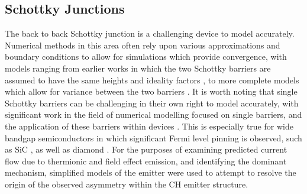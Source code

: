 \begin{refsection}
\subsection{Schottky Junctions}
The back to back Schottky junction is a challenging device to model accurately. Numerical methods in this area often rely upon various approximations and boundary conditions to allow for simulations which provide convergence, with models ranging from earlier works in which the two Schottky barriers are assumed to have the same heights and ideality factors \cite{Nam2005, Ramirez2006, Nagano2007}, to more complete models which allow for variance between the two barriers \cite{Nouchi2014, Wang2020, Grillo2020, DiBartolomeo2018, DiBartolomeo2019, DiBartolomeo20192}. It is worth noting that single Schottky barriers can be challenging in their own right to model accurately, with significant work in the field of numerical modelling focused on single barriers, and the application of these barriers within devices \cite{Furno2007, Wu2022, Splith2021}. This is especially true for wide bandgap semiconductors in which significant Fermi level pinning is observed, such as SiC \cite{Baum2022}, as well as diamond \cite{Wang2022, Han2023}. For the purposes of examining predicted current flow due to thermionic and field effect emission, and identifying the dominant mechanism, simplified models of the emitter were used to attempt to resolve the origin of the observed asymmetry within the CH emitter structure.


\end{refsection}
